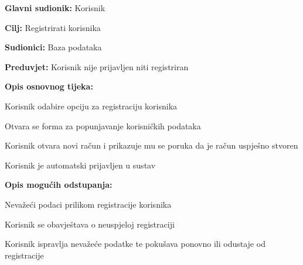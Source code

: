 \begin{packed_item}
\begin{packed_item}
\begin{packed_enum}
		\end{packed_enum}

	\end{packed_item}
\end{packed_item}

\pagebreak

\noindent {}
\begin{packed_item}

	\item \textbf{Glavni sudionik:} Korisnik
	\item \textbf{Cilj:} Registrirati korisnika
	\item \textbf{Sudionici:} Baza podataka
	\item \textbf{Preduvjet:} Korisnik nije prijavljen niti registriran
	\item \textbf{Opis osnovnog tijeka:}
	
	\item[] \begin{packed_enum}
		
		\item Korisnik odabire opciju za registraciju korisnika
		\item Otvara se forma za popunjavanje korisničkih podataka
		\item Korisnik otvara novi račun i prikazuje mu se poruka da je račun uspješno stvoren
		\item Korisnik je automatski prijavljen u sustav

	\end{packed_enum}

	\item  \textbf{Opis mogućih odstupanja:}
	
	\item[] \begin{packed_item}
	
		\item[3.a] Nevažeći podaci prilikom registracije korisnika
		\item[] \begin{packed_enum}
			
			\item Korisnik se obavještava o neuspjeloj registraciji
			\item Korisnik ispravlja nevažeće podatke te pokušava ponovno ili odustaje od registracije
			
		\end{packed_enum}
		
	\end{packed_item}
\end{packed_item}

